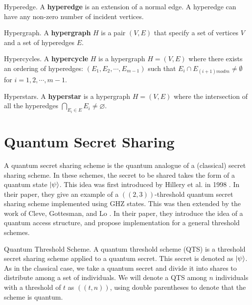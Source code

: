 \begin{definition}{Hyperedge.}
    \label{defn:hyperedge}
    A \textbf{hyperedge} is an extension of a normal edge. A hyperedge can have any non-zero number of incident vertices.
\end{definition}

\begin{definition}{Hypergraph.}
    \label{defn:hypergraph}
    A \textbf{hypergraph} $H$ is a pair $(V,E)$ that specify a set of vertices $V$ and a set of hyperedges $E$.
\end{definition}

\begin{definition}{Hypercycles.}
    \label{defn:hypercycle}
    A \textbf{hypercycle} $H$ is a hypergraph $H = (V,E)$ where there exists an ordering of hyperedges: $(E_1, E_2, \cdots, E_{m-1})$ such that $E_{i} \cap E_{(i+1) m o d m} \neq \emptyset$ for $i = 1,2,\cdots,m-1$.
\end{definition}

\begin{definition}{Hyperstars.}
    \label{defn:hyperstar}
    A \textbf{hyperstar} is a hypergraph $H = (V,E)$ where the intersection of all the hyperedges $\bigcap_{E_{i} \in E} E_{i} \neq \varnothing$.
\end{definition}

\section{Quantum Secret Sharing}

A quantum secret sharing scheme is the quantum analogue of a (classical) secret sharing scheme. In these schemes, the secret to be shared takes the form of a quantum state $\ket{\psi}$. This idea was first introduced by Hillery et al. in 1998 \cite{Hillery_1999}. In their paper, they give an example of a $((2,3))$-threshold quantum secret sharing scheme implemented using GHZ states. This was then extended by the work of Cleve, Gottesman, and Lo \cite{Cleve_1999}. In their paper, they introduce the idea of a quantum access structure, and propose implementation for a general threshold schemes.

\begin{definition}{Quantum Threshold Scheme.}
    \label{defn:qts}
    A quantum threshold scheme (QTS) is a threshold secret sharing scheme applied to a quantum secret. This secret is denoted as $\ket{\psi}$. As in the classical case, we take a quantum secret and divide it into shares to distribute among a set of individuals. We will denote a QTS among $n$ individuals with a threshold of $t$ as $((t,n))$, using double parentheses to denote that the scheme is quantum.
\end{definition}

